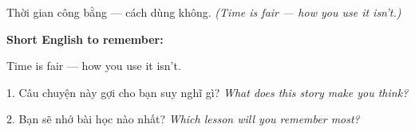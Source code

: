 \begin{baihoc}
Thời gian công bằng — cách dùng không.
\textit{(Time is fair — how you use it isn't.)}
\end{baihoc}

\begin{ghinhoanh}
\textbf{Short English to remember:}

Time is fair — how you use it isn't.

\end{ghinhoanh}

\begin{tuhocnhanh}
1. Câu chuyện này gợi cho bạn suy nghĩ gì? \textit{What does this story make you think?}

2. Bạn sẽ nhớ bài học nào nhất? \textit{Which lesson will you remember most?}
\end{tuhocnhanh}
\ngancach
